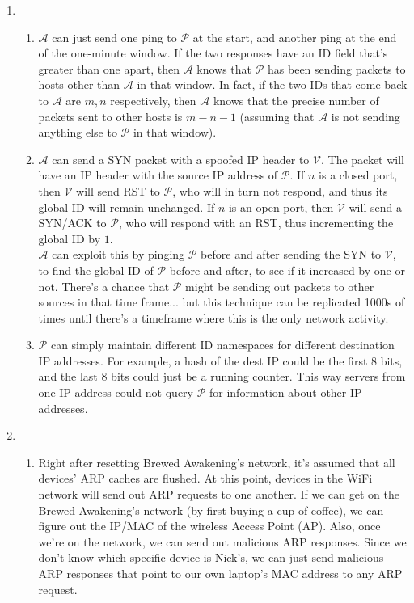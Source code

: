 \begin{enumerate}
  \pagebreak

  \item
    \begin{enumerate}
      \item $\mathcal{A}$ can just send one ping to $\mathcal{P}$ at the start, and another ping at the end of the one-minute window. If the two responses have an ID field that's greater than one apart, then $\mathcal{A}$ knows that $\mathcal{P}$ has been sending packets to hosts other than $\mathcal{A}$ in that window. In fact, if the two IDs that come back to $\mathcal{A}$ are $m,n$ respectively, then $\mathcal{A}$ knows that the precise number of packets sent to other hosts is $m-n-1$ (assuming that $\mathcal{A}$ is not sending anything else to $\mathcal{P}$ in that window).
      \item $\mathcal{A}$ can send a SYN packet with a spoofed IP header to $\mathcal{V}$. The packet will have an IP header with the source IP address of $\mathcal{P}$. If $n$ is a closed port, then $\mathcal{V}$ will send RST to $\mathcal{P}$, who will in turn not respond, and thus its global ID will remain unchanged. If $n$ is an open port, then $\mathcal{V}$ will send a SYN/ACK to $\mathcal{P}$, who will respond with an RST, thus incrementing the global ID by $1$. \\

        $\mathcal{A}$ can exploit this by pinging $\mathcal{P}$ before and after sending the SYN to $\mathcal{V}$, to find the global ID of $\mathcal{P}$ before and after, to see if it increased by one or not. There's a chance that $\mathcal{P}$ might be sending out packets to other sources in that time frame... but this technique can be replicated 1000s of times until there's a timeframe where this is the only network activity.

      \item $\mathcal{P}$ can simply maintain different ID namespaces for different destination IP addresses. For example, a hash of the dest IP could be the first 8 bits, and the last 8 bits could just be a running counter. This way servers from one IP address could not query $\mathcal{P}$ for information about other IP addresses.
    \end{enumerate}

  \pagebreak

  \item 
    \begin{enumerate}
      \item Right after resetting Brewed Awakening's network, it's assumed that all devices' ARP caches are flushed. At this point, devices in the WiFi network will send out ARP requests to one another. If we can get on the Brewed Awakening's network (by first buying a cup of coffee), we can figure out the IP/MAC of the wireless Access Point (AP). Also, once we're on the network, we can send out malicious ARP responses. Since we don't know which specific device is Nick's, we can just send malicious ARP responses that point to our own laptop's MAC address to any ARP request.\\


\end{enumerate}
\end{enumerate}

